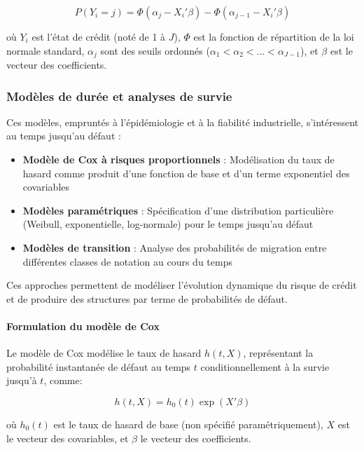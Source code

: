 \begin{equation}
P(Y_i = j) = \Phi(\alpha_j - X_i'\beta) - \Phi(\alpha_{j-1} - X_i'\beta)
\end{equation}

où $Y_i$ est l'état de crédit (noté de 1 à $J$), $\Phi$ est la fonction de répartition de la loi normale standard, $\alpha_j$ sont des seuils ordonnés ($\alpha_1 < \alpha_2 < ... < \alpha_{J-1}$), et $\beta$ est le vecteur des coefficients.

\subsubsection{Modèles de durée et analyses de survie}

Ces modèles, empruntés à l'épidémiologie et à la fiabilité industrielle, s'intéressent au temps jusqu'au défaut :

\begin{itemize}
    \item \textbf{Modèle de Cox à risques proportionnels} : Modélisation du taux de hasard comme produit d'une fonction de base et d'un terme exponentiel des covariables
    
    \item \textbf{Modèles paramétriques} : Spécification d'une distribution particulière (Weibull, exponentielle, log-normale) pour le temps jusqu'au défaut
    
    \item \textbf{Modèles de transition} : Analyse des probabilités de migration entre différentes classes de notation au cours du temps
\end{itemize}

Ces approches permettent de modéliser l'évolution dynamique du risque de crédit et de produire des structures par terme de probabilités de défaut.

\paragraph{Formulation du modèle de Cox}
Le modèle de Cox modélise le taux de hasard $h(t,X)$, représentant la probabilité instantanée de défaut au temps $t$ conditionnellement à la survie jusqu'à $t$, comme:

\begin{equation}
h(t,X) = h_0(t) \exp(X'\beta)
\end{equation}

où $h_0(t)$ est le taux de hasard de base (non spécifié paramétriquement), $X$ est le vecteur des covariables, et $\beta$ le vecteur des coefficients.

